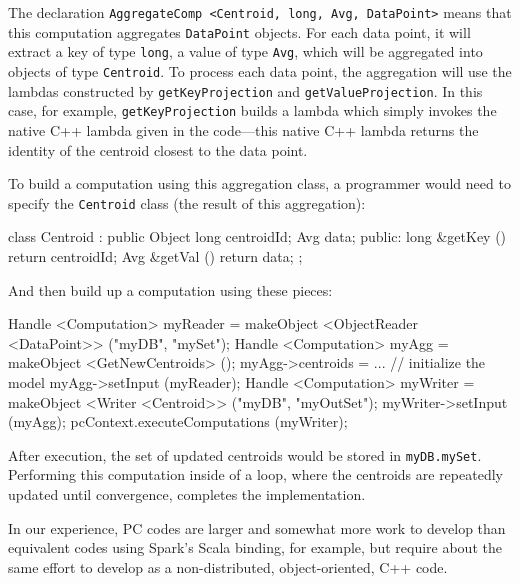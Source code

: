 \noindent 
The declaration \texttt{AggregateComp <Centroid, long, Avg, DataPoint>} means that this computation aggregates
\texttt{DataPoint} objects.  For each data point, it will extract a key of type \texttt{long}, a value of type \texttt{Avg}, which will be
aggregated into objects of type \texttt{Centroid}.  To process each data point, the aggregation will use the lambdas constructed by
\texttt{getKeyProjection} and \texttt{getValueProjection}.  
In this case, for example,
\texttt{getKeyProjection} builds a lambda which simply invokes the native C++ lambda given in the code---this
native C++ lambda returns the identity of the centroid closest to the data point.

To build a computation using this aggregation class, a programmer would need to specify the \texttt{Centroid} class (the result of this aggregation):

\begin{code}
class Centroid : public Object {
	long centroidId; 
	Avg data;
public:
	long &getKey () {return centroidId;}
	Avg &getVal () {return data;}
};
\end{code}

\noindent
And then build up a computation using these pieces:

\begin{code}
Handle <Computation> myReader = 
    makeObject <ObjectReader <DataPoint>> ("myDB", "mySet");
Handle <Computation> myAgg = makeObject <GetNewCentroids> ();
myAgg->centroids = ... // initialize the model
myAgg->setInput (myReader);
Handle <Computation> myWriter =  makeObject <Writer <Centroid>> ("myDB", "myOutSet");
    myWriter->setInput (myAgg);
pcContext.executeComputations (myWriter);
\end{code}

\noindent After execution, the set of updated centroids would be stored in \texttt{myDB.mySet}.
Performing this computation inside of a loop, where the centroids are repeatedly updated until convergence, completes the implementation.

In our experience, PC codes are larger and somewhat more work to develop than equivalent codes using Spark's Scala binding, for
example, but require about the same effort to develop as a non-distributed, object-oriented, C++ code.

